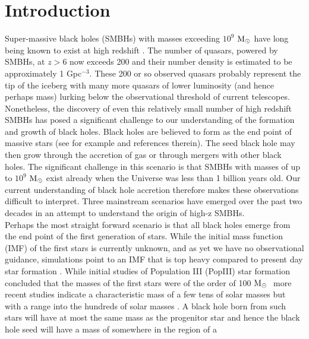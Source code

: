 \documentclass[graphics, twocolumn, usenatbib]{mn2e}
\newcommand{\msolar} {$\rm{M_{\odot}}~$}
\begin{document}
\section{Introduction} \label{Sec:Introduction}
Super-massive black holes (SMBHs) with masses exceeding $10^{9}$ \msolar have long being known to
exist at high redshift \citep[e.g.][]{Fan_2001, Dietrich_2002, Fan_2003, Vestergaard_2004,
  Fan_2004, Fan_06}. The number of quasars, powered by SMBHs, at $z > 6$ now exceeds
200 \citep{Matsuoka_2019} and their number
density is estimated to be approximately 1 Gpc$^{-3}$. These 200 or so observed quasars probably
represent the tip of the iceberg with many more quasars of lower luminosity (and hence perhaps mass)
lurking below the observational threshold of current telescopes. \\
\indent Nonetheless, the discovery of even this relatively small number of high redshift SMBHs
has posed a significant challenge to our understanding of the formation and growth of black holes.
Black holes are believed to form as the end point of massive stars (see for example
\cite{Volonteri_2010a} and references therein). The seed black hole may then grow through the
accretion of gas or through mergers with other black holes. The significant challenge in this
scenario is that SMBHs with masses of up to $10^{9}$ \msolar exist \citep[e.g][]{Banados_2018} already when
the Universe was less than 1 billion years old. Our current understanding of black hole accretion
therefore makes these observations difficult to interpret. Three mainstream scenarios have
emerged over the past two decades in an attempt to understand the origin of high-z SMBHs. \\
\indent Perhaps the most straight forward scenario is that all black holes emerge from the end
point of the first generation of stars. While the initial mass function (IMF) of the first stars
is currently unknown, and as yet we have no observational guidance, simulations point to an IMF that
is top heavy compared to present day star formation \citep{Yoshida_2006, Turk_2009,
  Clark_2011a, Hirano_2014}. While initial studies of Population III (PopIII) star formation
concluded that the masses of the first stars were of the order of 100 \msolar \citep{Bromm_1999,
  Abel_2002, Bromm_2002} more recent studies indicate a characteristic mass of a few tens of solar
masses but with a range into the hundreds of solar masses \citep{Stacy_2010, Stacy_2012, Stacy_2014,
  Hirano_2014}. A black hole born from such stars will have at most the same mass as the
progenitor star and hence the black hole seed will have a mass of somewhere in the region of a
\end{document}
